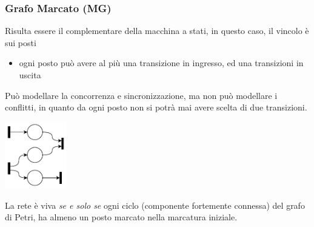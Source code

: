 \documentclass[10pt, letterpaper]{report}
\begin{document}
\subsubsection{Grafo Marcato (MG)}
Risulta essere il complementare della macchina a stati, in questo caso, il vincolo è sui posti\begin{itemize}
    \item ogni posto può avere al più una transizione in ingresso, ed una transizioni in uscita 
\end{itemize}
Può modellare la concorrenza e sincronizzazione, ma non può modellare i conflitti, in quanto da ogni posto non si potrà mai avere scelta di due transizioni.
\begin{center}
    \includegraphics[width=0.2\textwidth]{images/PetriMG.drawio.pdf}
\end{center}
La rete è viva \textit{se e solo se} ogni ciclo (componente fortemente connessa) del grafo di Petri, ha almeno un posto marcato nella marcatura iniziale.
\end{document}
